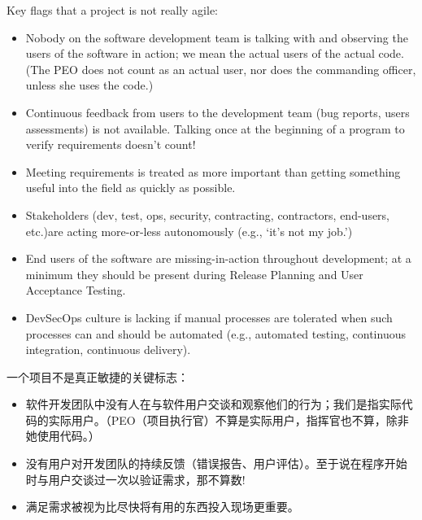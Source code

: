 \documentclass[UTF8, oneside]{ctexbook}
\begin{document}
\begin{paracol}{2}
  \switchcolumn*
  \begin{leftcolumn}
    Key flags that a project is not really agile:
    \begin{itemize}
      \item Nobody on the software development team is talking with and observing the users of the software in action; we mean the actual users of the actual code.\footnotemark[1] (The PEO does not count as an actual user, nor does the commanding officer, unless she uses the code.)
      \item Continuous feedback from users to the development team (bug reports, users       assessments) is not available. Talking once at the beginning of a program to verify requirements doesn’t count!
      \item Meeting requirements is treated as more important than getting something useful into the field as quickly as possible.
      \item Stakeholders (dev, test, ops, security, contracting, contractors, end-users, etc.)\footnotemark[2] are acting more-or-less autonomously (e.g., ‘it’s not my job.’)
      \item End users of the software are missing-in-action throughout development; at a minimum they should be present during Release Planning and User Acceptance Testing.
      \item DevSecOps culture is lacking if manual processes are tolerated when such processes can and should be automated (e.g., automated testing, continuous integration, continuous delivery).
    \end{itemize}
  \end{leftcolumn}
  \begin{rightcolumn}
    一个项目不是真正敏捷的关键标志：
    \begin{itemize}
      \item 软件开发团队中没有人在与软件用户交谈和观察他们的行为；我们是指实际代码的实际用户。\footnotemark[1]（PEO（项目执行官）不算是实际用户，指挥官也不算，除非她使用代码。）
      \item 没有用户对开发团队的持续反馈（错误报告、用户评估）。至于说在程序开始时与用户交谈过一次以验证需求，那不算数!
      \item 满足需求被视为比尽快将有用的东西投入现场更重要。

\end{itemize}
\end{rightcolumn}
\end{paracol}
\end{document}
